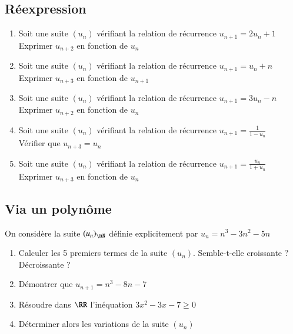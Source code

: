 \documentclass[oneside,12pt]{article}          %
\begin{document}
\subsection{Réexpression}
\begin{enumerate}
    \item Soit une suite $(u_n)$ vérifiant la relation de récurrence $u_{n+1} = 2u_n + 1$\\
    Exprimer $u_{n+2}$ en fonction de $u_n$
    \item Soit une suite $(u_n)$ vérifiant la relation de récurrence  $u_{n+1} = u_n + n$    \\
    Exprimer $u_{n+3}$ en fonction de $u_{n+1}$
    \item Soit une suite $(u_n)$ vérifiant la relation de récurrence  $u_{n+1} = 3u_n - n$    \\
    Exprimer $u_{n+2}$ en fonction de $u_n$
    \item Soit une suite $(u_n)$ vérifiant la relation de récurrence  $u_{n+1} = \frac{1}{1-u_n}$\\
    Vérifier que $u_{n+3}=u_n$
    \item Soit une suite $(u_n)$ vérifiant la relation de récurrence $u_{n+1}=\frac{u_n}{1+u_n}$\\
    Exprimer $u_{n+3}$ en fonction de $u_n$
\end{enumerate}



\subsection{Via un polynôme}
On considère la suite $(u_n)_{\nN}$ définie explicitement par $u_n=n^3-3n^2-5n$
\begin{enumerate}
	\item Calculer les 5 premiers termes de la suite $(u_n)$. Semble-t-elle croissante ? Décroissante ?
	\item Démontrer que $u_{n+1}=n^3-8n-7$
	\item Résoudre dans $\RR$ l'inéquation $3x^2-3x-7\geq0$
	\item Déterminer alors les variations de la suite $(u_n)$
\end{enumerate}
\end{document}
